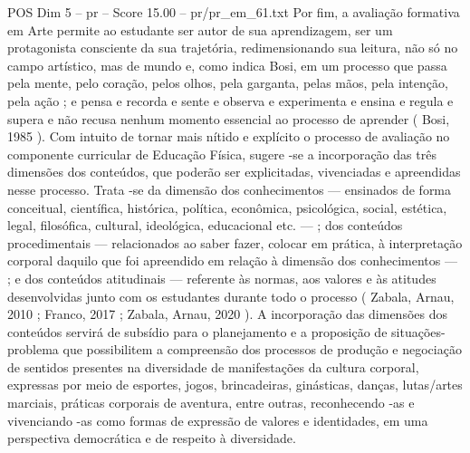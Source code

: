 \begin{textsample}{POS Dim 5 – pr – Score 15.00 – pr/pr\_em\_61.txt}  \label{ex:f5_pos_052}
Por fim, a avaliação formativa em Arte permite ao estudante ser autor de sua aprendizagem, ser um protagonista consciente da sua trajetória, redimensionando sua leitura, não só no campo artístico, mas de mundo e, como indica Bosi, em um processo que passa pela mente, pelo coração, pelos olhos, pela garganta, pelas mãos, pela intenção, pela ação ; e pensa e recorda e sente e observa e experimenta e ensina e regula e supera e não recusa nenhum momento essencial ao processo de aprender ( Bosi, 1985 ).
Com intuito de tornar mais nítido e explícito o processo de avaliação no componente curricular de Educação Física, sugere -se a incorporação das três dimensões dos conteúdos, que poderão ser explicitadas, vivenciadas e apreendidas nesse processo.
Trata -se da dimensão dos conhecimentos — ensinados de forma conceitual, científica, histórica, política, econômica, psicológica, social, estética, legal, filosófica, cultural, ideológica, educacional etc. — ; dos conteúdos procedimentais — relacionados ao saber fazer, colocar em prática, à interpretação corporal daquilo que foi apreendido em relação à dimensão dos conhecimentos — ; e dos conteúdos atitudinais — referente às normas, aos valores e às atitudes desenvolvidas junto com os estudantes durante todo o processo ( Zabala, Arnau, 2010 ; Franco, 2017 ; Zabala, Arnau, 2020 ).
A incorporação das dimensões dos conteúdos servirá de subsídio para o planejamento e a proposição de situações-problema que possibilitem a compreensão dos processos de produção e negociação de sentidos presentes na diversidade de manifestações da cultura corporal, expressas por meio de esportes, jogos, brincadeiras, ginásticas, danças, lutas/artes marciais, práticas corporais de aventura, entre outras, reconhecendo -as e vivenciando -as como formas de expressão de valores e identidades, em uma perspectiva democrática e de respeito à diversidade.

\end{textsample}
